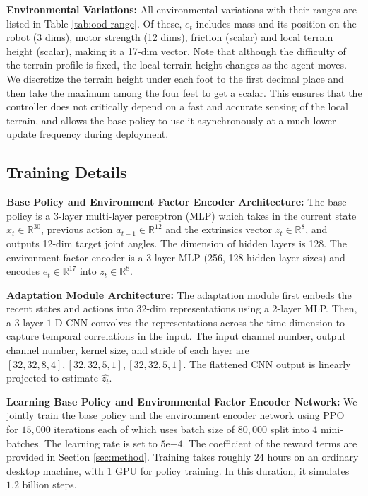 \documentclass[conference]{IEEEtran}
\begin{document}
\vspace{0.6em}\noindent\textbf{Environmental Variations:} All environmental variations with their ranges are listed in Table \ref{tab:ood-range}. Of these, $e_t$ includes mass and its position on the robot (3 dims), motor strength (12 dims), friction (scalar) and local terrain height (scalar), making it a 17-dim vector. Note that although the difficulty of the terrain profile is fixed, the local terrain height changes as the agent moves. We discretize the terrain height under each foot to the first decimal place and then take the maximum among the four feet to get a scalar. This ensures that the controller does not critically depend on a fast and accurate sensing of the local terrain, and allows the base policy to use it asynchronously at a much lower update frequency during deployment.

\subsection{Training Details}
\label{subsec:arch-details}
\noindent\textbf{Base Policy and Environment Factor Encoder Architecture:} The base policy is a 3-layer multi-layer perceptron (MLP) which takes in the current state $x_t \in \mathbb{R}^{30}$, previous action $a_{t-1} \in \mathbb{R}^{12}$ and the extrinsics vector $z_t \in \mathbb{R}^{8}$, and outputs 12-dim target joint angles. The dimension of hidden layers is 128. The environment factor encoder is a 3-layer MLP (256, 128 hidden layer sizes) and encodes $e_t \in \mathbb{R}^{17}$ into $z_t \in \mathbb{R}^8$.

\vspace{0.6em}\noindent\textbf{Adaptation Module Architecture:} The adaptation module first embeds the recent states and actions into 32-dim representations using a 2-layer MLP. Then, a 3-layer $1$-D CNN convolves the representations across the time dimension to capture temporal correlations in the input. The input channel number, output channel number, kernel size, and stride of each layer are $[32, 32, 8, 4], [32, 32, 5, 1], [32, 32, 5, 1]$. The flattened CNN output is linearly projected to estimate $\hat{z_t}$. 

\vspace{0.6em}\noindent\textbf{Learning Base Policy and Environmental Factor Encoder Network:} We jointly train the base policy and the environment encoder network using PPO ~\cite{schulman2017proximal} for $15,000$ iterations each of which uses batch size of $80,000$ split into $4$ mini-batches. The learning rate is set to $5\mathrm{e}{-4}$. The coefficient of the reward terms are provided in Section \ref{sec:method}. Training takes roughly $24$ hours on an ordinary desktop machine, with 1 GPU for policy training. In this duration, it simulates $1.2$ billion steps. 
\end{document}
